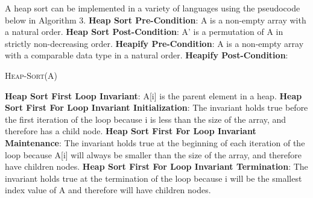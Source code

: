 \documentclass[onecolumn, 12pt, article]{IEEEtran}
\numberwithin{case}{problem}
\numberwithin{condition}{problem}
\numberwithin{condition}{subsection}
\numberwithin{definition}{section}
\theoremstyle{remark}
\numberwithin{question}{problem}
\theoremstyle{plain}
\numberwithin{answer}{problem}
\numberwithin{solution}{section}
\numberwithin{equation}{section}%
\begin{document}
A heap sort can be implemented in a variety of languages using the pseudocode below in Algorithm 3.
\newline
\textbf{Heap Sort Pre-Condition}: A is a non-empty array with a natural order.
\newline
\textbf{Heap Sort Post-Condition}: A' is a permutation of A in strictly non-decreasing order.
\newline
\textbf{Heapify Pre-Condition}: A is a non-empty array with a comparable data type in a natural order.
\newline
\textbf{Heapify Post-Condition}: %
\newline
\begin{algorithm}
\caption {\textsc{Heap-Sort}(A)}
\label{algo:heapsort}
\begin{algorithmic}[1]
\EndIf
{}
\EndIf
{}
\EndIf
{}
\EndProcedure
{}
\EndFor
{}
\EndFor
{}
\EndProcedure
\end{algorithmic}
\end{algorithm}
\newline
\textbf{Heap Sort First Loop Invariant}: A[i] is the parent element in a heap.
\newline
\textbf{Heap Sort First For Loop Invariant Initialization}: The invariant holds true before the first iteration of the loop because i is less than the size of the array, and therefore has a child node.
\newline
\textbf{Heap Sort First For Loop Invariant Maintenance}: The invariant holds true at the beginning of each iteration of the loop because A[i] will always be smaller than the size of the array, and therefore have children nodes.
\newline
\textbf{Heap Sort First For Loop Invariant Termination}: The invariant holds true at the termination of the loop because i will be the smallest index value of A and therefore will have children nodes.
\end{document}
